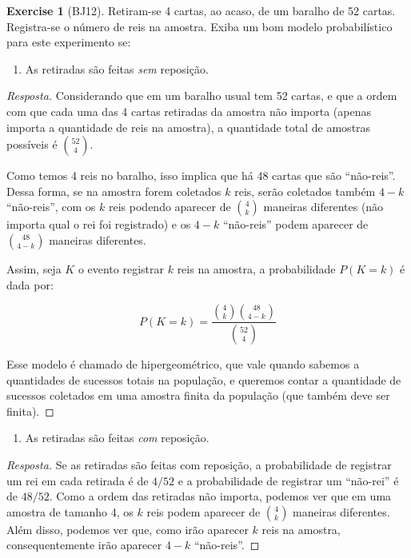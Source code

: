 \documentclass[
]{article}
\providecommand{\tightlist}{%
  \setlength{\itemsep}{0pt}\setlength{\parskip}{0pt}}
\theoremstyle{definition}
\theoremstyle{definition}
\theoremstyle{definition}
\newtheorem{exercise}{Exercise}[section]
\theoremstyle{definition}
\theoremstyle{remark}
\begin{document}
\begin{exercise}[BJ12]

Retiram-se 4 cartas, ao acaso, de um baralho de 52 cartas. Registra-se o número de reis na amostra. Exiba um bom modelo probabilístico para este experimento se:

\begin{enumerate}
\def\labelenumi{\alph{enumi})}
\tightlist
\item
  As retiradas são feitas \emph{sem} reposição.
\end{enumerate}

\begin{proof}[Resposta]
Considerando que em um baralho usual tem 52 cartas, e que a ordem com que cada uma das 4 cartas retiradas da amostra não importa (apenas importa a quantidade de reis na amostra), a quantidade total de amostras possíveis é \(\binom{52}{4}\).

Como temos 4 reis no baralho, isso implica que há 48 cartas que são ``não-reis''. Dessa forma, se na amostra forem coletados \(k\) reis, serão coletados também \(4-k\) ``não-reis'', com os \(k\) reis podendo aparecer de \(\binom{4}{k}\) maneiras diferentes (não importa qual o rei foi registrado) e os \(4-k\) ``não-reis'' podem aparecer de \(\binom{48}{4-k}\) maneiras diferentes.

Assim, seja \(K\) o evento registrar \(k\) reis na amostra, a probabilidade \(P(K=k)\) é dada por:

\begin{equation}
P(K=k) = \frac{\binom{4}{k}\binom{48}{4-k}}{\binom{52}{4}}
\label{eq:hgeomex}
\end{equation}

Esse modelo é chamado de hipergeométrico, que vale quando sabemos a quantidades de sucessos totais na população, e queremos contar a quantidade de sucessos coletados em uma amostra finita da população (que também deve ser finita).
\end{proof}

\begin{enumerate}
\def\labelenumi{\alph{enumi})}
\setcounter{enumi}{1}
\tightlist
\item
  As retiradas são feitas \emph{com} reposição.
\end{enumerate}

\begin{proof}[Resposta]
Se as retiradas são feitas com reposição, a probabilidade de registrar um rei em cada retirada é de \(4/52\) e a probabilidade de registrar um ``não-rei'' é de \(48/52\). Como a ordem das retiradas não importa, podemos ver que em uma amostra de tamanho 4, os \(k\) reis podem aparecer de \(\binom{4}{k}\) maneiras diferentes. Além disso, podemos ver que, como irão aparecer \(k\) reis na amostra, consequentemente irão aparecer \(4-k\) ``não-reis''.


\end{proof}
\end{exercise}
\end{document}
